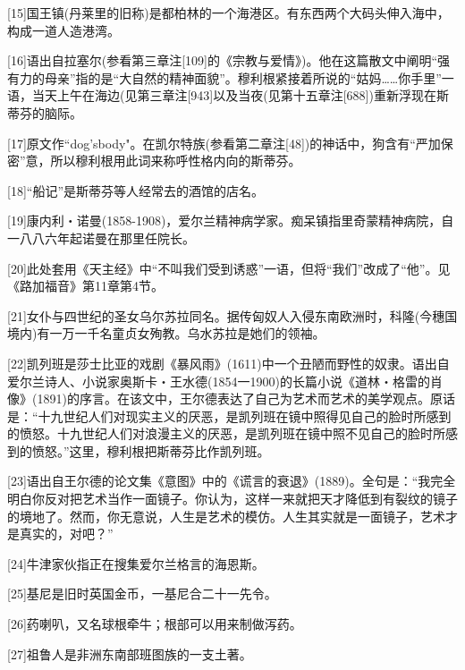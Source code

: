 \documentclass{article}
\begin{document}
[15]国王镇(丹莱里的旧称)是都柏林的一个海港区。有东西两个大码头伸入海中，构成一道人造港湾。



[16]语出自拉塞尔(参看第三章注[109]的《宗教与爱情》)。他在这篇散文中阐明“强有力的母亲”指的是“大自然的精神面貌”。穆利根紧接着所说的“姑妈……你手里”一语，当天上午在海边(见第三章注[943]以及当夜(见第十五章注[688])重新浮现在斯蒂芬的脑际。



[17]原文作“dog'sbody"。在凯尔特族(参看第二章注[48])的神话中，狗含有“严加保密”意，所以穆利根用此词来称呼性格内向的斯蒂芬。



[18]“船记”是斯蒂芬等人经常去的酒馆的店名。



[19]康内利・诺曼(1858-1908)，爱尔兰精神病学家。痴呆镇指里奇蒙精神病院，自一八八六年起诺曼在那里任院长。



[20]此处套用《天主经》中“不叫我们受到诱惑”一语，但将“我们”改成了“他”。见《路加福音》第11章第4节。



[21]女仆与四世纪的圣女乌尔苏拉同名。据传匈奴人入侵东南欧洲时，科隆(今穗国境内)有一万一千名童贞女殉教。乌水苏拉是她们的领袖。



[22]凯列班是莎士比亚的戏剧《暴风雨》(1611)中一个丑陋而野性的奴隶。语出自爱尔兰诗人、小说家奥斯卡・王水德(1854一1900)的长篇小说《道林・格雷的肖像》(1891)的序言。在该文中，王尔德表达了自己为艺术而艺术的美学观点。原话是：“十九世纪人们对现实主义的厌恶，是凯列班在镜中照得见自己的脸时所感到的愤怒。十九世纪人们对浪漫主义的厌恶，是凯列班在镜中照不见自己的脸时所感到的愤怒。”这里，穆利根把斯蒂芬比作凯列班。



[23]语出自王尔德的论文集《意图》中的《谎言的衰退》(1889)。全句是：“我完全明白你反对把艺术当作一面镜子。你认为，这样一来就把天才降低到有裂纹的镜子的境地了。然而，你无意说，人生是艺术的模仿。人生其实就是一面镜子，艺术才是真实的，对吧？”



[24]牛津家伙指正在搜集爱尔兰格言的海恩斯。



[25]基尼是旧时英国金币，一基尼合二十一先令。



[26]药喇叭，又名球根牵牛；根部可以用来制做泻药。



[27]祖鲁人是非洲东南部班图族的一支土著。
\end{document}
